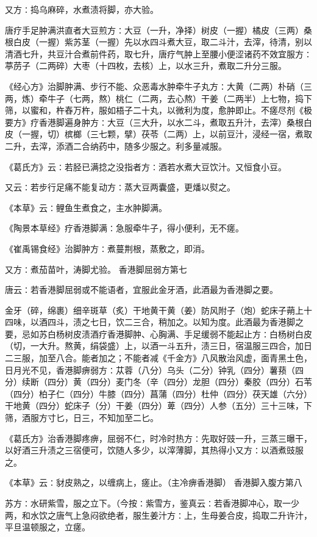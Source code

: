 \documentclass[a4paper,12pt,UTF8,twoside]{ctexbook}
\begin{document}
又方∶捣乌麻碎，水煮渍将脚，亦大验。

唐疗手足肿满洪直者大豆煎方∶大豆（一升，净择）树皮（一握）橘皮（三两）桑根白皮（一握）紫苏茎（一握）先以水四斗煮大豆，取二斗汁，去滓，待清，别以清酒七升，共豆汁合煮前件药，取七升，唐疗气肿上至腰小便涩诸药不效宜服方∶葶苈子（二两碎）大枣（十四枚，去核）上，以水三升，煮取二升分三服。

《经心方》治脚肿满、步行不能、众恶毒水肿牵牛子丸方∶大黄（二两）朴硝（三两，炼）牵牛子（七两，熬）桃仁（二两，去心熬）干姜（二两半）上七物，捣下筛，以蜜和，杵舂万杵，服如梧子二十丸，以微利为度，愈肿即止。不瘥尽剂《极要方》疗香港脚遍身肿方∶大豆（三大升，以水二斗，煮取五升汁，去滓）桑根白皮（一握，切）槟榔（三七颗，擘）茯苓（二两）上，以前豆汁，浸经一宿，煮取二升，去滓，添酒二合纳药中，随多少服之。利多量减服。

《葛氏方》云∶若胫已满捻之没指者方∶酒若水煮大豆饮汁。又恒食小豆。

又云∶若步行足痛不能复动方∶蒸大豆两囊盛，更燔以熨之。

《本草》云∶鲤鱼生煮食之，主水肿脚满。

《陶景本草经》疗香港脚满∶急服牵牛子，得小便利，无不瘥。

《崔禹锡食经》治脚肿方∶煮蔓荆根，蒸敷之，即消。

又方∶煮茄苗叶，涛脚尤验。
香港脚屈弱方第七

唐云∶若香港脚屈弱或不能语者，宜服此金牙酒，此酒最为香港脚之要。

金牙（碎，绵裹）细辛斑草（炙）干地黄干黄（姜）防风附子（炮）蛇床子蒴上十四味，以酒四斗，渍之七日，饮二三合，稍加之。以知为度。此酒最为香港脚之要，忌如苏白杨树皮渍酒疗香港脚肿、心胸满、手足缓弱不能起止方∶白杨树白皮（切，一大升。熬黄，绢袋盛）上，以酒一斗五升，渍三日，宿温服三四合，加日二三服，加至八合。能者加之；不能者减《千金方》八风散治风虚，面青黑土色，日月光不见，香港脚痹弱方∶苁蓉（八分）乌头（二分）钟乳（四分）薯蓣（四分）续断（四分）黄（四分）麦门冬（辛（四分）龙胆（四分）秦胶（四分）石苇（四分）柏子仁（四分）牛膝（四分）菖蒲（四分）杜仲（四分）茯天雄（六分）干地黄（四分）蛇床子（分）干姜（四分）萆（四分）人参（五分）三十三味，下筛，酒服方寸匕，日三，不知加至二匕。

《葛氏方》治香港脚疼痹，屈弱不仁，时冷时热方∶先取好豉一升，三蒸三曝干，以好酒三升渍之三宿便可，饮随人多少，以滓薄脚，其热得小又方∶以酒煮豉服之。

《本草》云∶豺皮熟之，以缠病上，瘥止。（主冷痹香港脚）
香港脚入腹方第八

苏方∶水研紫雪，服之立下。（今按∶紫雪方，鉴真云∶若香港脚冲心，取一少两，和水饮之唐气上急闷欲绝者，服生姜汁方∶上，生母姜合皮，捣取二升许汁，平旦温顿服之，立瘥。
\end{document}
